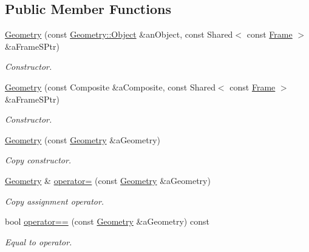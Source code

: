 \subsection*{Public Member Functions}
\begin{DoxyCompactItemize}
\item 
\hyperlink{classostk_1_1physics_1_1env_1_1object_1_1_geometry_a99cd68601f35dd7c24bb7e441728b65a}{Geometry} (const \hyperlink{classostk_1_1physics_1_1env_1_1object_1_1_geometry_abeade8931056612deaa868abdaac8c9c}{Geometry\+::\+Object} \&an\+Object, const Shared$<$ const \hyperlink{classostk_1_1physics_1_1coord_1_1_frame}{Frame} $>$ \&a\+Frame\+S\+Ptr)
\begin{DoxyCompactList}\small\item\em Constructor. \end{DoxyCompactList}\item 
\hyperlink{classostk_1_1physics_1_1env_1_1object_1_1_geometry_a0d841619ef4bc44ec3a98d412af9b1a7}{Geometry} (const Composite \&a\+Composite, const Shared$<$ const \hyperlink{classostk_1_1physics_1_1coord_1_1_frame}{Frame} $>$ \&a\+Frame\+S\+Ptr)
\begin{DoxyCompactList}\small\item\em Constructor. \end{DoxyCompactList}\item 
\hyperlink{classostk_1_1physics_1_1env_1_1object_1_1_geometry_a9b163b274588de65ad05290e421e0345}{Geometry} (const \hyperlink{classostk_1_1physics_1_1env_1_1object_1_1_geometry}{Geometry} \&a\+Geometry)
\begin{DoxyCompactList}\small\item\em Copy constructor. \end{DoxyCompactList}\item 
\hyperlink{classostk_1_1physics_1_1env_1_1object_1_1_geometry}{Geometry} \& \hyperlink{classostk_1_1physics_1_1env_1_1object_1_1_geometry_a777d72a587112d74bad356180f75b6d0}{operator=} (const \hyperlink{classostk_1_1physics_1_1env_1_1object_1_1_geometry}{Geometry} \&a\+Geometry)
\begin{DoxyCompactList}\small\item\em Copy assignment operator. \end{DoxyCompactList}\item 
bool \hyperlink{classostk_1_1physics_1_1env_1_1object_1_1_geometry_aa3d15f7a766995279b88ad7fdc2befe1}{operator==} (const \hyperlink{classostk_1_1physics_1_1env_1_1object_1_1_geometry}{Geometry} \&a\+Geometry) const
\begin{DoxyCompactList}\small\item\em Equal to operator. \end{DoxyCompactList}\item 

\end{DoxyCompactItemize}
